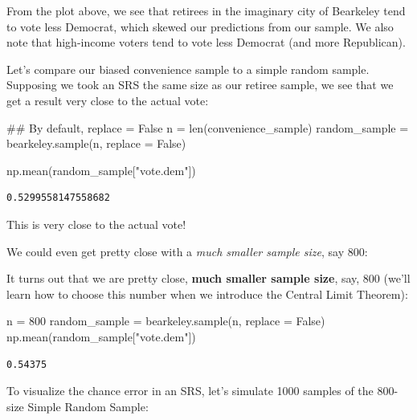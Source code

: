 \documentclass[
  letterpaper,
  DIV=11,
  numbers=noendperiod]{scrreprt}
\newenvironment{Shaded}{\begin{snugshade}}{\end{snugshade}}
\newcommand{\BuiltInTok}[1]{\textcolor[rgb]{0.00,0.23,0.31}{#1}}
\newcommand{\CommentTok}[1]{\textcolor[rgb]{0.37,0.37,0.37}{#1}}
\newcommand{\DecValTok}[1]{\textcolor[rgb]{0.68,0.00,0.00}{#1}}
\newcommand{\NormalTok}[1]{\textcolor[rgb]{0.00,0.23,0.31}{#1}}
\newcommand{\OperatorTok}[1]{\textcolor[rgb]{0.37,0.37,0.37}{#1}}
\newcommand{\StringTok}[1]{\textcolor[rgb]{0.13,0.47,0.30}{#1}}
\newcommand{\VariableTok}[1]{\textcolor[rgb]{0.07,0.07,0.07}{#1}}
\begin{document}
From the plot above, we see that retirees in the imaginary city of
Bearkeley tend to vote less Democrat, which skewed our predictions from
our sample. We also note that high-income voters tend to vote less
Democrat (and more Republican).

Let's compare our biased convenience sample to a simple random sample.
Supposing we took an SRS the same size as our retiree sample, we see
that we get a result very close to the actual vote:

\begin{Shaded}
\begin{Highlighting}[]
\CommentTok{\#\# By default, replace = False}
\NormalTok{n }\OperatorTok{=} \BuiltInTok{len}\NormalTok{(convenience\_sample)}
\NormalTok{random\_sample }\OperatorTok{=}\NormalTok{ bearkeley.sample(n, replace }\OperatorTok{=} \VariableTok{False}\NormalTok{)}

\NormalTok{np.mean(random\_sample[}\StringTok{"vote.dem"}\NormalTok{])}
\end{Highlighting}
\end{Shaded}

\begin{verbatim}
0.5299558147558682
\end{verbatim}

This is very close to the actual vote!

We could even get pretty close with a \emph{much smaller sample size},
say 800:

It turns out that we are pretty close, \textbf{much smaller sample
size}, say, 800 (we'll learn how to choose this number when we introduce
the Central Limit Theorem):

\begin{Shaded}
\begin{Highlighting}[]
\NormalTok{n }\OperatorTok{=} \DecValTok{800}
\NormalTok{random\_sample }\OperatorTok{=}\NormalTok{ bearkeley.sample(n, replace }\OperatorTok{=} \VariableTok{False}\NormalTok{)}
\NormalTok{np.mean(random\_sample[}\StringTok{"vote.dem"}\NormalTok{])}
\end{Highlighting}
\end{Shaded}

\begin{verbatim}
0.54375
\end{verbatim}

To visualize the chance error in an SRS, let's simulate 1000 samples of
the 800-size Simple Random Sample:
\end{document}
